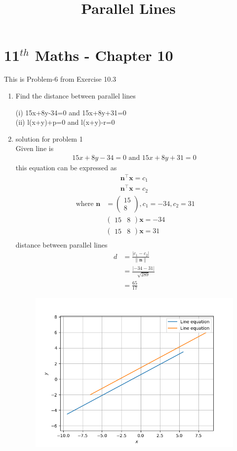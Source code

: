 \documentclass[12pt]{article}
\providecommand{\abs}[1]{\left\vert#1\right\vert}
\providecommand{\norm}[1]{\left\lVert#1\right\rVert}
\newcommand{\myvec}[1]{\ensuremath{\begin{pmatrix}#1\end{pmatrix}}}
\let\vec\mathbf
\begin{document}
\begin{center}
\title{\textbf{Parallel Lines}}
\date{\vspace{-5ex}} %
\maketitle
\end{center}
\setcounter{page}{1}
\section*{11$^{th}$ Maths - Chapter 10}
This is Problem-6 from Exercise 10.3
\begin{enumerate}
	\item Find the distance between parallel lines 
	
(i) 15x+8y-34=0 and  15x+8y+31=0 \\
(ii) l(x+y)+p=0 and  l(x+y)-r=0
\	
\item solution for problem 1
\\
Given line is 
\begin{align}
	15x+8y-34=0\text{ and }15x+8y+31=0
\end{align}
this equation can be expressed as 
\begin{align}
	\vec{n}^{\top}\vec{x}=c_1\\	
	\vec{n}^{\top}\vec{x}=c_2	
\end{align}
\begin{align}
\text{ where }
\vec{n}&=\myvec{15\\8},c_1=-34, c_2= 31\\
& \myvec{15&8}\vec{x}=-34\\ 
& \myvec{15&8}\vec{x}=31\\
\end{align} 
distance between parallel lines 
\begin{align}
d&=\frac{\abs{c_1-c_2}}{\norm{\vec{n}}}\\
&=\frac{\abs{-34-31}}{\sqrt{289}}\\
&=\frac{65}{17}
\end{align}
\begin{figure}[h!]
\begin{center}
\includegraphics[width=\columnwidth]{para.png}

\end{center}
\end{figure}
\end{enumerate}
\end{document}
